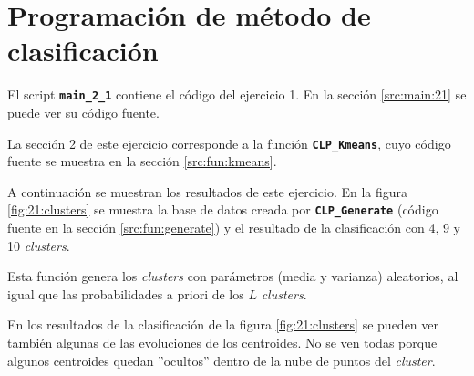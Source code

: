 \documentclass[11pt]{article} %
\begin{document}
\section{Programación de método de clasificación}

El script \textbf{\texttt{main\_2\_1}} contiene el código del ejercicio 1. En
la sección \ref{src:main:21} se puede ver su código fuente.

La sección 2 de este ejercicio corresponde a la función
\textbf{\texttt{CLP\_Kmeans}}, cuyo código fuente se muestra en la sección
\ref{src:fun:kmeans}.

A continuación se muestran los resultados de este ejercicio. En la figura
\ref{fig:21:clusters} se muestra la base de datos creada
por \textbf{\texttt{CLP\_Generate}} (código fuente en la sección
\ref{src:fun:generate}) y el resultado de la clasificación con 4, 9 y 10
\emph{clusters}.

Esta función genera los \emph{clusters} con parámetros (media y varianza)
aleatorios, al igual que las probabilidades a priori de los $L$ \emph{clusters}.

En los resultados de la clasificación de la figura \ref{fig:21:clusters} se
pueden ver también algunas de las evoluciones de los centroides. No se ven todas
porque algunos centroides quedan ''ocultos'' dentro de la nube de puntos del
\emph{cluster}.
\end{document}
